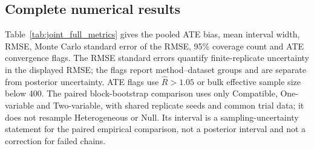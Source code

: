\documentclass[11pt]{article}
\theoremstyle{remark}\newtheorem{remark}{Remark}[section]
\providecommand{\DIFaddtex}[1]{{\protect\color{blue} \sf #1}} %
\providecommand{\DIFadd}[1]{\texorpdfstring{\DIFaddtex{#1}}{#1}} %
\begin{document}
\subsection{\DIFadd{Complete numerical results}}

\DIFadd{Table~\ref{tab:joint_full_metrics} gives the pooled ATE bias, mean interval width, RMSE, Monte Carlo standard error of the RMSE, 95\% coverage count and ATE convergence flags. The RMSE standard errors quantify finite-replicate uncertainty in the displayed RMSE; the flags report method--dataset groups and are separate from posterior uncertainty. ATE flags use $\widehat R>1.05$ or bulk effective sample size below 400. The paired block-bootstrap comparison uses only Compatible, One-variable and Two-variable, with shared replicate seeds and common trial data; it does not resample Heterogeneous or Null. Its interval is a sampling-uncertainty statement for the paired empirical comparison, not a posterior interval and not a correction for failed chains.
}
\end{document}
